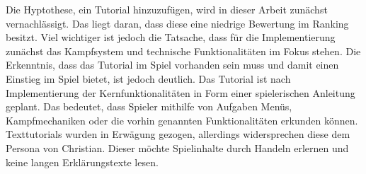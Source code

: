 Die Hyptothese, ein Tutorial hinzuzufügen, wird in dieser Arbeit zunächst vernachlässigt. Das liegt daran, dass diese eine niedrige Bewertung im Ranking besitzt. Viel wichtiger ist jedoch die Tatsache, dass für die Implementierung zunächst das Kampfsystem und technische Funktionalitäten im Fokus stehen. Die Erkenntnis, dass das Tutorial im Spiel vorhanden sein muss und damit einen Einstieg im Spiel bietet, ist jedoch deutlich. Das Tutorial ist nach Implementierung der Kernfunktionalitäten in Form einer spielerischen Anleitung geplant. Das bedeutet, dass Spieler mithilfe von Aufgaben Menüs, Kampfmechaniken oder die vorhin genannten Funktionalitäten erkunden können. Texttutorials wurden in Erwägung gezogen, allerdings widersprechen diese dem Persona von Christian. Dieser möchte Spielinhalte durch Handeln erlernen und keine langen Erklärungstexte lesen.

